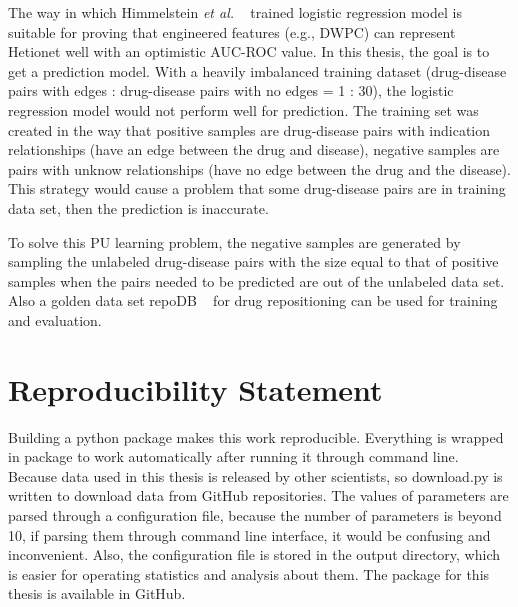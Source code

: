 The way in which Himmelstein \textit{et al.} ~\cite{himmelstein_systematic_2017} trained logistic regression model is suitable for proving that engineered features (e.g., \ac{DWPC}) can represent Hetionet well with an optimistic \ac{AUC-ROC} value. In this thesis, the goal is to get a prediction model. With a heavily imbalanced training dataset (drug-disease pairs with edges : drug-disease pairs with no edges = 1 : 30), the logistic regression model would not perform well for prediction. The training set was created in the way that positive samples are drug-disease pairs with indication relationships (have an edge between the drug and disease), negative samples are pairs with unknow relationships (have no edge between the drug and the disease). This strategy would cause a problem that some drug-disease pairs are in training data set, then the prediction is inaccurate.

To solve this \ac{PU} learning problem, the negative samples are generated by sampling the unlabeled drug-disease pairs with the size equal to that of positive samples when the pairs needed to be predicted are out of the unlabeled data set. Also a golden data set repoDB ~\cite{shameer_systematic_2018} for drug repositioning can be used for training and evaluation.

\section{Reproducibility Statement}

Building a python package makes this work reproducible. Everything is wrapped in package to work automatically after running it through command line. Because data used in this thesis is released by other scientists, so download.py is written to download data from GitHub repositories. The values of parameters are parsed through a configuration file, because the number of parameters is beyond 10, if parsing them through command line interface, it would be confusing and inconvenient. Also, the configuration file is stored in the output directory, which is easier for operating statistics and analysis about them. The package for this thesis is available in GitHub.
